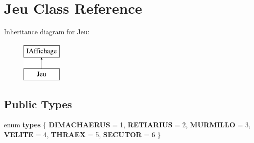 \hypertarget{class_jeu}{\section{\-Jeu \-Class \-Reference}
\label{class_jeu}
}
\-Inheritance diagram for \-Jeu\-:\begin{figure}[H]
\begin{center}
\leavevmode
\includegraphics[height=2.000000cm]{class_jeu}
\end{center}
\end{figure}
\subsection*{\-Public \-Types}
\begin{DoxyCompactItemize}
\item 
enum {\bfseries types} \{ \*
{\bfseries \-D\-I\-M\-A\-C\-H\-A\-E\-R\-U\-S} =  1, 
{\bfseries \-R\-E\-T\-I\-A\-R\-I\-U\-S} =  2, 
{\bfseries \-M\-U\-R\-M\-I\-L\-L\-O} =  3, 
{\bfseries \-V\-E\-L\-I\-T\-E} =  4, 
\*
{\bfseries \-T\-H\-R\-A\-E\-X} =  5, 
{\bfseries \-S\-E\-C\-U\-T\-O\-R} =  6
 \}
\end{DoxyCompactItemize}
